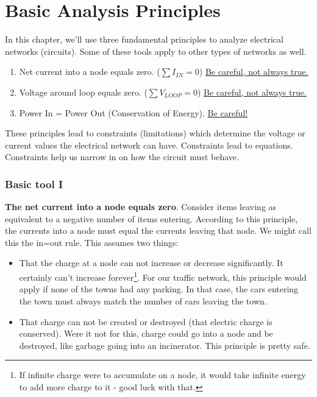 \chapter{Basic Analysis Principles}
In this chapter, we'll use three fundamental principles to analyze electrical networks (circuits). Some of these tools apply to other types of networks as well.

\begin{enumerate}
\item Net current into a node equals zero. ($\sum{I_{IN}}=0$) \underline{Be careful, not always true.}
\item Voltage around loop equals zero. ($\sum{V_{LOOP}}=0$) \underline{Be careful, not always true.}
\item Power In = Power Out (Conservation of Energy). \underline{Be careful!}
\end{enumerate}

\par
These principles lead to constraints (limitations) which determine the voltage or current values the electrical network can have. Constraints lead to equations. Constraints help us narrow in on how the circuit must behave.


\subsection{Basic tool I}

\textbf{The net current into a node equals zero}. Consider items leaving as equivalent to a negative number of items entering. According to this principle, the currents into a node must equal the currents leaving that node. We might call this the in=out rule. This assumes two things:

\begin{itemize}
\item That the charge at a node can not increase or decrease significantly. It certainly can't increase forever\footnote{If infinite charge were to accumulate on a node, it would take infinite energy to add more charge to it - good luck with that.}. For our traffic network, this principle would apply if none of the towns had any parking. In that case, the cars entering the town must always match the number of cars leaving the town.
\item That charge can not be created or destroyed (that electric charge is conserved). Were it not for this, charge could go into a node and be destroyed, like garbage going into an incinerator. This principle is pretty safe.
\end{itemize}
\par

